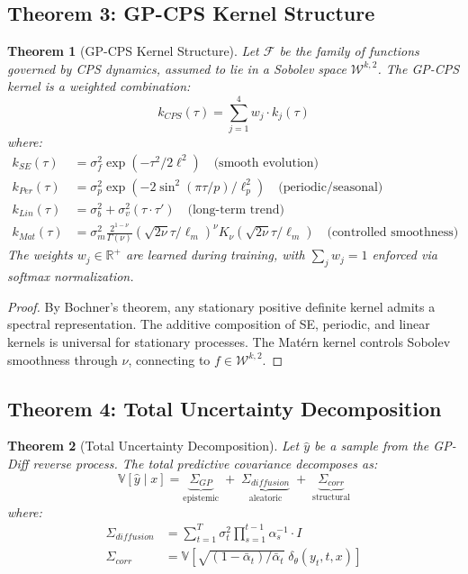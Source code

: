 \documentclass[conference]{IEEEtran}
\newtheorem{theorem}{Theorem}
\begin{document}
\subsection{Theorem 3: GP-CPS Kernel Structure}

\begin{theorem}[GP-CPS Kernel Structure]
\label{thm:kernel}
Let $\mathcal{F}$ be the family of functions governed by CPS dynamics, assumed to lie in a Sobolev space $\mathcal{W}^{k,2}$. The GP-CPS kernel is a weighted combination:
\begin{equation}
\boxed{k_{CPS}(\tau) = \sum_{j=1}^4 w_j \cdot k_j(\tau)} \label{eq:cps_kernel}
\end{equation}
where:
\begin{align}
k_{SE}(\tau) &= \sigma_f^2 \exp(-\tau^2 / 2\ell^2) \quad \text{(smooth evolution)}\\
k_{Per}(\tau) &= \sigma_p^2 \exp(-2\sin^2(\pi\tau/p) / \ell_p^2) \quad \text{(periodic/seasonal)}\\
k_{Lin}(\tau) &= \sigma_b^2 + \sigma_v^2 (\tau \cdot \tau') \quad \text{(long-term trend)}\\
k_{Mat}(\tau) &= \sigma_m^2 \frac{2^{1-\nu}}{\Gamma(\nu)} (\sqrt{2\nu}\tau/\ell_m)^\nu K_\nu(\sqrt{2\nu}\tau/\ell_m) \quad \text{(controlled smoothness)}
\end{align}
The weights $w_j \in \mathbb{R}^+$ are learned during training, with $\sum_j w_j = 1$ enforced via softmax normalization.
\end{theorem}

\begin{proof}
By Bochner's theorem, any stationary positive definite kernel admits a spectral representation. The additive composition of SE, periodic, and linear kernels is universal for stationary processes. The Mat\'ern kernel controls Sobolev smoothness through $\nu$, connecting to $f \in \mathcal{W}^{k,2}$.
\end{proof}

\subsection{Theorem 4: Total Uncertainty Decomposition}

\begin{theorem}[Total Uncertainty Decomposition]
\label{thm:uncertainty}
Let $\hat{y}$ be a sample from the GP-Diff reverse process. The total predictive covariance decomposes as:
\begin{equation}
\boxed{\mathbb{V}[\hat{y} \mid x] = \underbrace{\Sigma_{GP}}_{\text{epistemic}} \;+\; \underbrace{\Sigma_{diffusion}}_{\text{aleatoric}} \;+\; \underbrace{\Sigma_{corr}}_{\text{structural}}} \label{eq:uncertainty}
\end{equation}
where:
\begin{align}
\Sigma_{diffusion} &= \sum_{t=1}^T \sigma_t^2 \prod_{s=1}^{t-1} \alpha_s^{-1} \cdot I \\
\Sigma_{corr} &= \mathbb{V}\left[\sqrt{(1 - \bar{\alpha}_t)/\bar{\alpha}_t}\; \delta_\theta(y_t, t, x)\right]
\end{align}
\end{theorem}
\end{document}
